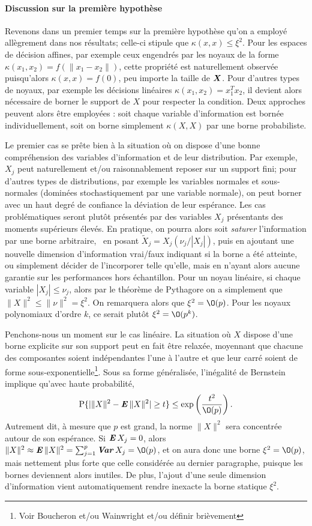 \paragraph{Discussion sur la première hypothèse}


Revenons dans un premier temps sur la première hypothèse qu'on a employé allègrement dans
nos résultats; celle-ci stipule que $\kappa(x,x) \leq \xi^2$. Pour les espaces de décision affines,
par exemple ceux engendrés par les noyaux de la forme $\kappa(x_1,x_2) = f(\|x_1-x_2\|)$, cette
propriété est naturellement observée puisqu'alors $\kappa(x,x) = f(0)$, peu importe la taille
de $\bm{X}$. Pour d'autres types de noyaux, par exemple les décisions linéaires
$\kappa(x_1,x_2) = x_1^Tx_2$, il devient alors nécessaire de borner le support de $X$ pour
respecter la condition. Deux approches peuvent alors être employées : soit chaque variable
d'information est bornée individuellement, soit on borne simplement $\kappa(X,X)$ par une borne
probabiliste.

Le premier cas se prête bien à la situation où on dispose d'une bonne compréhension des
variables d'information et de leur distribution. Par exemple, $X_j$ peut naturellement
et/ou raisonnablement reposer sur un support fini; pour d'autres types de distributions,
par exemple les variables normales et sous-normales (dominées stochastiquement par une
variable normale), on peut borner avec un haut degré de confiance la déviation de leur
espérance. Les cas problématiques seront plutôt présentés par des variables $X_j$
présentants des moments supérieurs élevés. En pratique, on pourra alors soit
\textit{saturer} l'information par une borne arbitraire, \ie\ en posant
$\tilde X_j = X_j(\nu_j/|X_j|)$, puis en ajoutant une nouvelle dimension d'information
vrai/faux indiquant si la borne a été atteinte, ou simplement décider de l'incorporer
telle qu'elle, mais en n'ayant alors aucune garantie sur les performances hors
échantillon. Pour un noyau linéaire, si chaque variable $|X_j| \leq \nu_j$, alors par le
théorème de Pythagore on a simplement que $\|X\|^2 \leq \|\nu\|^2 = \xi^2$. On remarquera alors
que $\xi^2 = \O(p)$. Pour les noyaux polynomiaux d'ordre $k$, ce serait plutôt
$\xi^2 = \O(p^k)$.

Penchons-nous un moment sur le cas linéaire. La situation où $X$ dispose d'une borne
explicite sur son support peut en fait être relaxée, moyennant que chacune des composantes
soient indépendantes l'une à l'autre et que leur carré soient de forme
sous-exponentielle\footnote{Voir Boucheron et/ou Wainwright et/ou définir
  brièvement}. Sous sa forme généralisée, l'inégalité de Bernstein implique qu'avec haute
probabilité,
\begin{equation}
  \pp\{|\|X\|^2 - \E\|X\|^2| \geq t\} \leq \exp\left(\frac{t^2}{\O(p)}\right).
\end{equation}
Autrement dit, à mesure que $p$ est grand, la norme $\|X\|^2$ sera concentrée autour de
son espérance. Si $\operatorname{\mbox{\textbf{\textit{E}}}} X_j=0$, alors $\|X\|^2 \approx \E\|X\|^2 = \sumj \Var X_j = \O(p)$, et on
aura donc une borne $\xi^2 = \O(p)$, mais nettement plus forte que celle considérée au
dernier paragraphe, puisque les bornes deviennent alors inutiles. De plus, l'ajout d'une
seule dimension d'information vient automatiquement rendre inexacte la borne statique
$\xi^2$. 

